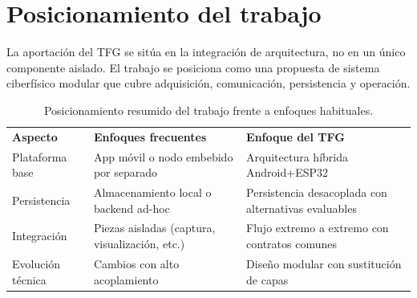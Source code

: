 

\section{Posicionamiento del trabajo}

La aportación del TFG se sitúa en la integración de arquitectura, no en un único componente aislado.
El trabajo se posiciona como una propuesta de sistema ciberfísico modular que cubre adquisición, comunicación, persistencia y operación.

\begin{table}[htbp]
  \centering
  \small
  \begin{tabularx}{\textwidth}{>{\raggedright\arraybackslash}p{} >{\raggedright\arraybackslash}X >{\raggedright\arraybackslash}X}
    \rowcolor{udcpink!25}
    \textbf{Aspecto} & \textbf{Enfoques frecuentes} & \textbf{Enfoque del TFG} \\
    Plataforma base & App móvil o nodo embebido por separado & Arquitectura híbrida Android+ESP32 \\
    Persistencia & Almacenamiento local o backend ad-hoc & Persistencia desacoplada con alternativas evaluables \\
    Integración & Piezas aisladas (captura, visualización, etc.) & Flujo extremo a extremo con contratos comunes \\
    Evolución técnica & Cambios con alto acoplamiento & Diseño modular con sustitución de capas \\
  \end{tabularx}
  \caption{Posicionamiento resumido del trabajo frente a enfoques habituales.}
  \label{tab:estado-arte-posicionamiento}
\end{table}

